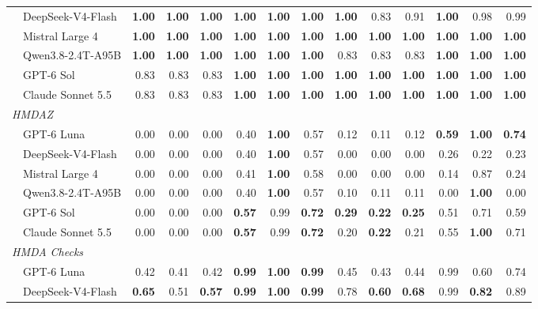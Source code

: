 \begin{table}[t]
\begin{tabular}{l@{\hspace{0.6em}}rrr@{\hspace{0.6em}}rrr@{\hspace{0.6em}}rrr@{\hspace{0.6em}}rrr}
  ~~DeepSeek-V4-Flash & \textbf{1.00} & \textbf{1.00} & \textbf{1.00} & \textbf{1.00} & \textbf{1.00} & \textbf{1.00} & \textbf{1.00} & 0.83 & 0.91 & \textbf{1.00} & 0.98 & 0.99 \\
  ~~Mistral Large 4 & \textbf{1.00} & \textbf{1.00} & \textbf{1.00} & \textbf{1.00} & \textbf{1.00} & \textbf{1.00} & \textbf{1.00} & \textbf{1.00} & \textbf{1.00} & \textbf{1.00} & \textbf{1.00} & \textbf{1.00} \\
  ~~Qwen3.8-2.4T-A95B & \textbf{1.00} & \textbf{1.00} & \textbf{1.00} & \textbf{1.00} & \textbf{1.00} & \textbf{1.00} & 0.83 & 0.83 & 0.83 & \textbf{1.00} & \textbf{1.00} & \textbf{1.00} \\
  ~~GPT-6 Sol & 0.83 & 0.83 & 0.83 & \textbf{1.00} & \textbf{1.00} & \textbf{1.00} & \textbf{1.00} & \textbf{1.00} & \textbf{1.00} & \textbf{1.00} & \textbf{1.00} & \textbf{1.00} \\
  ~~Claude Sonnet 5.5 & 0.83 & 0.83 & 0.83 & \textbf{1.00} & \textbf{1.00} & \textbf{1.00} & \textbf{1.00} & \textbf{1.00} & \textbf{1.00} & \textbf{1.00} & \textbf{1.00} & \textbf{1.00} \\
  \midrule
  \multicolumn{13}{l}{\textit{HMDAZ}} \\
  ~~GPT-6 Luna & 0.00 & 0.00 & 0.00 & 0.40 & \textbf{1.00} & 0.57 & 0.12 & 0.11 & 0.12 & \textbf{0.59} & \textbf{1.00} & \textbf{0.74} \\
  ~~DeepSeek-V4-Flash & 0.00 & 0.00 & 0.00 & 0.40 & \textbf{1.00} & 0.57 & 0.00 & 0.00 & 0.00 & 0.26 & 0.22 & 0.23 \\
  ~~Mistral Large 4 & 0.00 & 0.00 & 0.00 & 0.41 & \textbf{1.00} & 0.58 & 0.00 & 0.00 & 0.00 & 0.14 & 0.87 & 0.24 \\
  ~~Qwen3.8-2.4T-A95B & 0.00 & 0.00 & 0.00 & 0.40 & \textbf{1.00} & 0.57 & 0.10 & 0.11 & 0.11 & 0.00 & \textbf{1.00} & 0.00 \\
  ~~GPT-6 Sol & 0.00 & 0.00 & 0.00 & \textbf{0.57} & 0.99 & \textbf{0.72} & \textbf{0.29} & \textbf{0.22} & \textbf{0.25} & 0.51 & 0.71 & 0.59 \\
  ~~Claude Sonnet 5.5 & 0.00 & 0.00 & 0.00 & \textbf{0.57} & 0.99 & \textbf{0.72} & 0.20 & \textbf{0.22} & 0.21 & 0.55 & \textbf{1.00} & 0.71 \\
  \midrule
  \multicolumn{13}{l}{\textit{HMDA Checks}} \\
  ~~GPT-6 Luna & 0.42 & 0.41 & 0.42 & \textbf{0.99} & \textbf{1.00} & \textbf{0.99} & 0.45 & 0.43 & 0.44 & 0.99 & 0.60 & 0.74 \\
  ~~DeepSeek-V4-Flash & \textbf{0.65} & 0.51 & \textbf{0.57} & \textbf{0.99} & \textbf{1.00} & \textbf{0.99} & 0.78 & \textbf{0.60} & \textbf{0.68} & 0.99 & \textbf{0.82} & 0.89 \\

\end{tabular}
\end{table}
